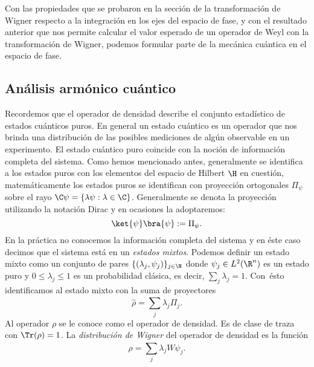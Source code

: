   Con las propiedades que se probaron en la sección de la
  transformación de Wigner respecto a la integración en los
  ejes del espacio de fase, y con el resultado anterior que
  nos permite calcular el valor esperado de un operador de
  Weyl con la transformación de Wigner, podemos formular
  parte de la mecánica cuántica en el espacio de fase.

  \subsection{Análisis armónico cuántico}

  Recordemos que el operador de densidad describe el
  conjunto estadístico de estados cuánticos puros. En
  general un estado cuántico es un operador que nos brinda
  una distribución de las posibles mediciones de algún
  observable en un experimento. El estado cuántico puro
  coincide con la noción de información completa del
  sistema. Como hemos mencionado antes, generalmente se
  identifica a los estados puros con los elementos del
  espacio de Hilbert $\H$ en cuestión, matemáticamente los
  estados puros se identifican con proyección ortogonales
  $\Pi_\psi$ sobre el rayo $\C \psi = \{\lambda \psi :
  \lambda \in \C\}$. Generalmente se denota la proyección
  utilizando la notación Dirac y en ocasiones la
  adoptaremos:
  \[
    \ket{\psi}\bra{\psi} := \Pi_\psi. 
  \] 
  En la práctica no conocemos la información completa del
  sistema y en éste caso decimos que el sistema está en un
  \textit{estados mixtos}. Podemos definir un estado mixto
  como un conjunto de pares $\{(\lambda_j,\psi_j)\}_{j \in
  \N}$ donde $\psi_j \in L^2(\R^{n})$ es un estado puro y
  $0 \leq \lambda_j \leq 1$ es un probabilidad clásica, es
  decir, $\sum_j \lambda_j = 1$. Con ésto identificamos al
  estado mixto con la suma de proyectores
  \[
    \hat{\rho} = \sum_{j}^{} \lambda_j \Pi_j.
  \] 
  Al operador $\rho$ se le conoce como el operador de
  densidad. Es de clase de traza con $\Tr(\rho) = 1$. La
  \textit{distribución de Wigner} del operador de densidad
  es la función
  \[
    \rho = \sum_{j}^{} \lambda_j W\psi_j.
  \] 

